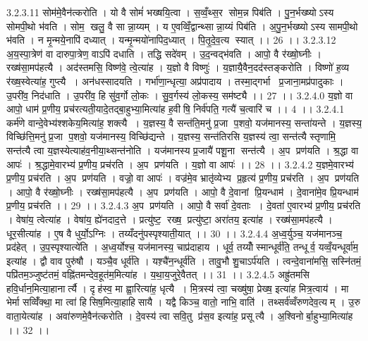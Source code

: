 3.2.3.11
सोम॑मे॒वैन॑त्करोति । यो वै सोमं॑ भख्षयि॒त्वा । स॒व्वँ॒थ्स॒र सोम॒न्न पिब॑ति । पु॒न॒र्भख्ष्योऽस्य सोमपी॒थो भ॑वति । सोम॒ खलु॒ वै सान्ना॒य्यम् । य ए॒वव्विँ॒द्वान्थ्सान्ना॒य्यं पिब॑ति । अ॒पु॒न॒र्भख्ष्योऽस्य सामपी॒थो भ॑वति । न मृ॒न्मये॒नापि॑ दध्यात् । यन्मृ॒न्मयो॑नापिद॒ध्यात् । पि॒तृ॒दे॒व॒त्य॑ स्यात् ।। 26 ।।
3.2.3.12
अ॒य॒स्पा॒त्रेण॑ वा दारुपा॒त्रेण॒ वाऽपि॑ दधाति । तद्धि सदे॑वम् । उ॒द॒न्वद्भ॑वति । आपो॒ वै र॑ख्षो॒घ्नीः । रख्ष॑सा॒मप॑हत्यै । अद॑स्तमसि॒ विष्ण॑वे॒ त्वे॒त्या॑ह । य॒ज्ञो वै विष्णुः॑ । य॒ज्ञायै॒वैन॒दद॑स्तङ्करोति । विष्णो॑ ह॒व्य र॑ख्ष॒स्वेत्या॑ह॒ गुप्त्यै । अन॑धस्सादयति । गर्भा॑णा॒न्धृत्या॒ अप्र॑पादाय । तस्मा॒द्गर्भा प्र॒जाना॒मप्र॑पादुकाः । उ॒परी॑व॒ निद॑धाति । उ॒परी॑व॒ हि सु॑व॒र्गो लो॒कः । सु॒व॒र्गस्य॑ लो॒कस्य॒ सम॑ष्ट्यै ।। 27 ।।
3.2.4.0
य॒ज्ञो वा आपो॒ धाम॑ प्र॒णीय॒ प्रच॑रत्यती॒यादे॒तद्बा॒हुभ्या॒मित्या॑ह ह॒वीषि॒ निर्व॑पति॒ गत्यै॑ च॒त्वारि॑ च ।। 4 ।।
3.2.4.1
कर्म॑णे वान्दे॒वेभ्य॑श्शकेय॒मित्या॑ह॒ शक्त्यै । य॒ज्ञस्य॒ वै सन्त॑ति॒मनु॑ प्र॒जा प॒शवो॒ यज॑मानस्य॒ सन्ता॑यन्ते । य॒ज्ञस्य॒ विच्छि॑त्ति॒मनु॑ प्र॒जा प॒शवो॒ यज॑मानस्य॒ विच्छि॑द्यन्ते । य॒ज्ञस्य॒ सन्त॑तिरसि य॒ज्ञस्य॑ त्वा॒ सन्त॑त्यै स्तृणामि॒ सन्त॑त्यै त्वा य॒ज्ञस्येत्याह॑व॒नीया॒थ्सन्त॑नोति । यज॑मानस्य प्र॒जायै॑ पशू॒ना सन्त॑त्यै । अ॒प प्रण॑यति । श्र॒द्धा वा आपः॑ । श्र॒द्धामे॒वारभ्य॑ प्र॒णीय॒ प्रच॑रति । अ॒प प्रण॑यति । य॒ज्ञो वा आपः॑ ।। 28 ।।
3.2.4.2
य॒ज्ञमे॒वारभ्य॑ प्र॒णीय॒ प्रच॑रति । अ॒प प्रण॑यति । वज्रो॒ वा आपः॑ । वज्र॑मे॒व भ्रातृ॑व्येभ्य प्र॒हृत्य॑ प्र॒णीय॒ प्रच॑रति । अ॒प प्रण॑यति । आपो॒ वै र॑ख्षो॒घ्नीः । रख्ष॑सा॒मप॑हत्यै । अ॒प प्रण॑यति । आपो॒ वै दे॒वानां प्रि॒यन्धाम॑ । दे॒वाना॑मे॒व प्रि॒यन्धाम॑ प्र॒णीय॒ प्रच॑रति ।। 29 ।।
3.2.4.3
अ॒प प्रण॑यति । आपो॒ वै सर्वा॑ दे॒वताः । दे॒वता॑ ए॒वारभ्य॑ प्र॒णीय॒ प्रच॑रति । वेषा॑य॒ त्वेत्या॑ह । वेषा॑य॒ ह्ये॑नदाद॒त्ते । प्रत्यु॑ष्ट॒॒ रख्ष॒ प्रत्यु॑ष्टा॒ अरा॑तय॒ इत्या॑ह । रख्ष॑सा॒मप॑हत्यै । धूर॒सीत्या॑ह । ए॒ष वै धुर्यो॒ऽग्निः । तय्यँदनु॑पस्पृश्याती॒यात् ।। 30 ।।
3.2.4.4
अ॒ध्व॒र्युञ्च॒ यज॑मानञ्च॒ प्रद॑हेत् । उ॒प॒स्पृश्यात्ये॑ति । अ॒ध्व॒र्योश्च॒ यज॑मानस्य॒ चाप्र॑दाहाय । धूर्व॒ तय्योँस्मान्धूर्व॑ति॒ तन्धूर्व॒ यव्वँ॒यन्धूर्वा॑म॒ इत्या॑ह । द्वौ वाव पुरु॑षौ । यञ्चै॒व धूर्व॑ति । यश़्चै॑न॒न्धूर्व॑ति । तावु॒भौ शु॒चाऽर्प॑यति । त्वन्दे॒वाना॑मसि॒ सस्नि॑तमं॒ पप्रि॑तम॒ञ्जुष्ट॑तमं॒ वह्नि॑तमन्देव॒हूत॑म॒मित्या॑ह । य॒था॒य॒जुरे॒वैतत् ।। 31 ।।
3.2.4.5
अह्रु॑तमसि हवि॒र्धान॒मित्या॒हानार्त्यै । दृह॑स्व॒ मा ह्वा॒रित्या॑ह॒ धृत्यै । मि॒त्रस्य॑ त्वा॒ चख्षु॑षा॒ प्रेख्ष॒ इत्या॑ह मित्र॒त्वाय॑ । मा भेर्मा सव्विँ॑क्था॒ मा त्वा॑ हिसिष॒मित्या॒हाहि॑सायै । यद्वै किञ्च॒ वातो॒ नाभि॒ वाति॑ । तथ्सर्व॑व्वँरुणदेव॒त्यम् । उ॒रु वाता॒येत्या॑ह । अवा॑रुणमे॒वैन॑त्करोति । दे॒वस्य॑ त्वा सवि॒तु प्र॑स॒व इत्या॑ह॒ प्रसूत्यै । अ॒श्विनोर्बा॒हुभ्या॒मित्या॑ह ।। 32 ।।
